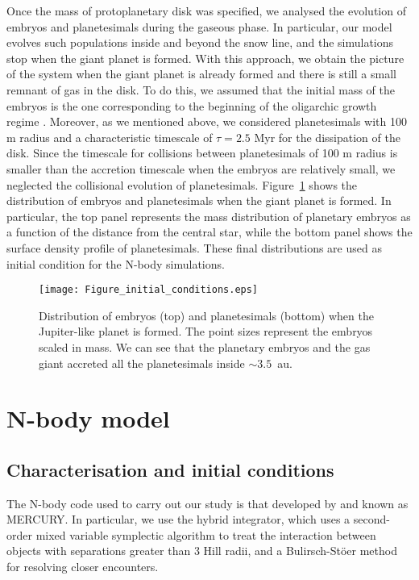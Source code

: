 \documentclass{aa}
\begin{document}
Once the mass of protoplanetary disk was specified, we analysed the evolution of embryos and planetesimals during the gaseous phase.
In particular, our model evolves such populations inside and beyond the snow line, and the simulations stop when the giant planet is
formed. With this approach, we obtain the picture of the system when the giant planet is already formed and there is still a small
remnant of gas in the disk. To do this, we assumed that the initial mass of the embryos is the one corresponding to the beginning of
the oligarchic growth regime \citep{Ida1993}. Moreover, as we mentioned above, we considered planetesimals with 100 m radius
and a characteristic timescale of $\tau= 2.5$ Myr for the dissipation of the disk. Since the timescale for collisions between planetesimals of 100 m radius is smaller than the accretion timescale when the embryos are relatively small, we neglected the collisional evolution of planetesimals.
Figure~\ref{fig:initial_conditions} shows the distribution of embryos and planetesimals when the giant planet is formed.
In particular, the top panel represents the mass distribution of planetary embryos as a function of the distance from the central star,
while the bottom panel shows the surface density profile of planetesimals. These final distributions are used as initial condition
for the N-body simulations.

\begin{figure}[htb!]
\centering
\texttt{[image: Figure\_initial\_conditions.eps]}
\caption{Distribution of embryos (top) and planetesimals (bottom) when the Jupiter-like planet is formed. The point sizes represent
the embryos scaled in mass. We can see that the planetary embryos and the gas giant accreted all the planetesimals inside $\sim 3.5$~au.}
\label{fig:initial_conditions}
\end{figure}

\section{N-body model}
\label{section_nbody}

\subsection{Characterisation and initial conditions}

The N-body code used to carry out our study is that developed by \citet{Chambers1999} and known as MERCURY. In particular,
we use the hybrid integrator, which uses a second-order mixed variable symplectic algorithm to treat the interaction between objects
with separations greater than 3 Hill radii, and a Bulirsch-St\"oer method for resolving closer encounters.
\end{document}
